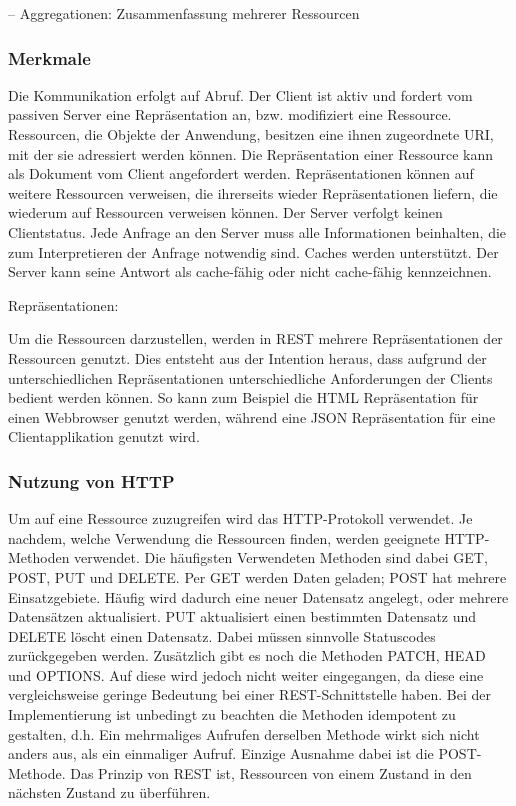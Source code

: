 –	Aggregationen: Zusammenfassung mehrerer Ressourcen

\subsubsection{Merkmale}
\label{sec:RESTMerkmale}

Die Kommunikation erfolgt auf Abruf. Der Client ist aktiv und fordert vom passiven Server eine Repräsentation an, bzw. modifiziert eine Ressource. Ressourcen, die Objekte der Anwendung, besitzen eine ihnen zugeordnete \ac{URI}, mit der sie adressiert werden können. Die Repräsentation einer Ressource kann als Dokument vom Client angefordert werden. Repräsentationen können auf weitere Ressourcen verweisen, die ihrerseits wieder Repräsentationen liefern, die wiederum auf Ressourcen verweisen können. Der Server verfolgt keinen Clientstatus. Jede Anfrage an den Server muss alle Informationen beinhalten, die zum Interpretieren der Anfrage notwendig sind. Caches werden unterstützt. Der Server kann seine Antwort als cache-fähig oder nicht cache-fähig kennzeichnen.

Repräsentationen:

Um die Ressourcen darzustellen, werden in \ac{REST} mehrere Repräsentationen der Ressourcen genutzt. Dies entsteht aus der Intention heraus, dass aufgrund der unterschiedlichen Repräsentationen unterschiedliche Anforderungen der Clients bedient werden können. So kann zum Beispiel die \ac{HTML} Repräsentation für einen Webbrowser genutzt werden, während eine \ac{JSON} Repräsentation für eine Clientapplikation genutzt wird.

\subsubsection{Nutzung von \ac{HTTP}}
\label{sec:RESTHTTP}


Um auf eine Ressource zuzugreifen wird das \ac{HTTP}-Protokoll verwendet. Je nachdem, welche Verwendung die Ressourcen finden, werden geeignete \ac{HTTP}-Methoden verwendet. Die häufigsten Verwendeten Methoden sind dabei GET, POST, PUT und DELETE. Per GET werden Daten geladen; POST hat mehrere Einsatzgebiete. Häufig wird dadurch eine neuer Datensatz angelegt, oder mehrere Datensätzen aktualisiert. PUT aktualisiert einen bestimmten Datensatz und DELETE löscht einen Datensatz. Dabei müssen sinnvolle Statuscodes zurückgegeben werden. Zusätzlich gibt es noch die Methoden PATCH, HEAD und OPTIONS. Auf diese wird jedoch nicht weiter eingegangen, da diese eine vergleichsweise geringe Bedeutung bei einer \ac{REST}-Schnittstelle haben. Bei der Implementierung ist unbedingt zu beachten die Methoden idempotent zu gestalten, d.h. Ein mehrmaliges Aufrufen derselben Methode wirkt sich nicht anders aus, als ein einmaliger Aufruf. Einzige Ausnahme dabei ist die POST-Methode. Das Prinzip von \ac{REST} ist, Ressourcen von einem Zustand in den nächsten Zustand zu überführen.

